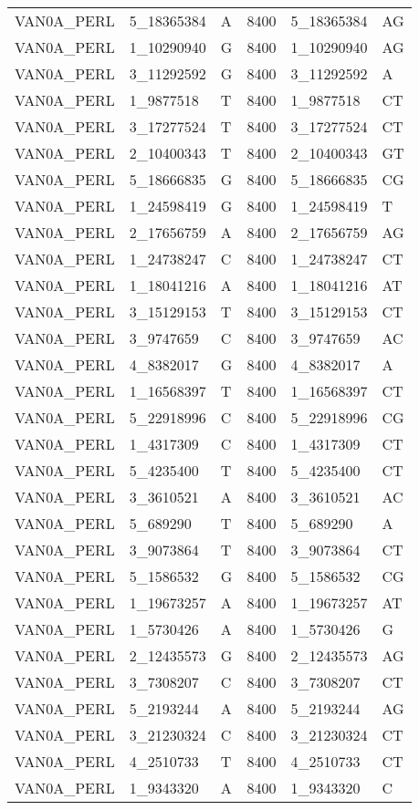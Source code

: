 \begin{center}
\begin{longtable}{|l|l|l|l|l|l|}
VAN0A\_PERL&5\_18365384&A&8400&5\_18365384&AG\\
VAN0A\_PERL&1\_10290940&G&8400&1\_10290940&AG\\
VAN0A\_PERL&3\_11292592&G&8400&3\_11292592&A\\
VAN0A\_PERL&1\_9877518&T&8400&1\_9877518&CT\\
VAN0A\_PERL&3\_17277524&T&8400&3\_17277524&CT\\
VAN0A\_PERL&2\_10400343&T&8400&2\_10400343&GT\\
VAN0A\_PERL&5\_18666835&G&8400&5\_18666835&CG\\
VAN0A\_PERL&1\_24598419&G&8400&1\_24598419&T\\
VAN0A\_PERL&2\_17656759&A&8400&2\_17656759&AG\\
VAN0A\_PERL&1\_24738247&C&8400&1\_24738247&CT\\
VAN0A\_PERL&1\_18041216&A&8400&1\_18041216&AT\\
VAN0A\_PERL&3\_15129153&T&8400&3\_15129153&CT\\
VAN0A\_PERL&3\_9747659&C&8400&3\_9747659&AC\\
VAN0A\_PERL&4\_8382017&G&8400&4\_8382017&A\\
VAN0A\_PERL&1\_16568397&T&8400&1\_16568397&CT\\
VAN0A\_PERL&5\_22918996&C&8400&5\_22918996&CG\\
VAN0A\_PERL&1\_4317309&C&8400&1\_4317309&CT\\
VAN0A\_PERL&5\_4235400&T&8400&5\_4235400&CT\\
VAN0A\_PERL&3\_3610521&A&8400&3\_3610521&AC\\
VAN0A\_PERL&5\_689290&T&8400&5\_689290&A\\
VAN0A\_PERL&3\_9073864&T&8400&3\_9073864&CT\\
VAN0A\_PERL&5\_1586532&G&8400&5\_1586532&CG\\
VAN0A\_PERL&1\_19673257&A&8400&1\_19673257&AT\\
VAN0A\_PERL&1\_5730426&A&8400&1\_5730426&G\\
VAN0A\_PERL&2\_12435573&G&8400&2\_12435573&AG\\
VAN0A\_PERL&3\_7308207&C&8400&3\_7308207&CT\\
VAN0A\_PERL&5\_2193244&A&8400&5\_2193244&AG\\
VAN0A\_PERL&3\_21230324&C&8400&3\_21230324&CT\\
VAN0A\_PERL&4\_2510733&T&8400&4\_2510733&CT\\
VAN0A\_PERL&1\_9343320&A&8400&1\_9343320&C\\

\end{longtable}
\end{center}
